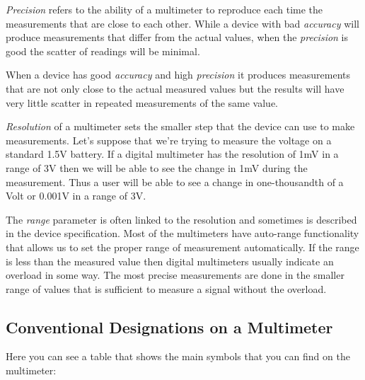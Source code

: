 \documentclass[../main.tex]{subfiles}
\begin{document}
\emph{Precision} refers to the ability of a multimeter to reproduce each time
the measurements that are close to each other.  While a device with bad
\emph{accuracy} will produce measurements that differ from the actual values,
when the \emph{precision} is good the scatter of readings will be minimal.

When a device has good \emph{accuracy} and high \emph{precision} it produces
measurements that are not only close to the actual measured values but the
results will have very little scatter in repeated measurements of the same
value.

\emph{Resolution} of a multimeter sets the smaller step that the device can use
to make measurements.  Let's suppose that we're trying to measure the voltage on
a standard 1.5V battery.  If a digital multimeter has the resolution of 1mV in a
range of 3V then we will be able to see the change in 1mV during the
measurement.  Thus a user will be able to see a change in one-thousandth of a
Volt or 0.001V in a range of 3V.

The \emph{range} parameter is often linked to the resolution and sometimes is
described in the device specification.  Most of the multimeters have auto-range
functionality that allows us to set the proper range of measurement
automatically.  If the range is less than the measured value then digital
multimeters usually indicate an overload in some way.  The most precise
measurements are done in the smaller range of values that is sufficient to
measure a signal without the overload.

\subsection{Conventional Designations on a Multimeter}

Here you can see a table that shows the main symbols that you can find on the
multimeter:
\end{document}

